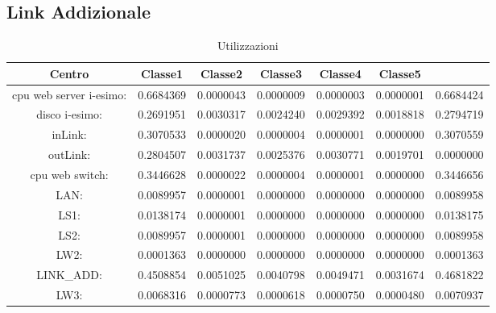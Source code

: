 \subsection{Link Addizionale}
\begin{table}[H]
\begin{center}\begin{scriptsize}
\begin{tabular}{||c|c|c|c|c|c||}
\hline
Centro &Classe1 &Classe2 &Classe3 &Classe4 &Classe5\\
\hline
\hline
 cpu web server i-esimo: 	&0.6684369	&0.0000043	&0.0000009	&0.0000003	&0.0000001	&0.6684424	\\\hline
 disco i-esimo: 	&0.2691951	&0.0030317	&0.0024240	&0.0029392	&0.0018818	&0.2794719	\\\hline
 inLink: 	&0.3070533	&0.0000020	&0.0000004	&0.0000001	&0.0000000	&0.3070559	\\\hline
 outLink: 	&0.2804507	&0.0031737	&0.0025376	&0.0030771	&0.0019701	&0.0000000	\\\hline
 cpu web switch: 	&0.3446628	&0.0000022	&0.0000004	&0.0000001	&0.0000000	&0.3446656	\\\hline
 LAN: 	&0.0089957	&0.0000001	&0.0000000	&0.0000000	&0.0000000	&0.0089958	\\\hline
 LS1: 	&0.0138174	&0.0000001	&0.0000000	&0.0000000	&0.0000000	&0.0138175	\\\hline
 LS2:	&0.0089957	&0.0000001	&0.0000000	&0.0000000	&0.0000000	&0.0089958	\\\hline
 LW2: 	&0.0001363	&0.0000000	&0.0000000	&0.0000000	&0.0000000	&0.0001363	\\\hline
 LINK_ADD: 	&0.4508854	&0.0051025	&0.0040798	&0.0049471	&0.0031674	&0.4681822	\\\hline
 LW3: 	&0.0068316	&0.0000773	&0.0000618	&0.0000750	&0.0000480	&0.0070937	\\\hline
\end{tabular}
\end{scriptsize}\end{center}
\caption{Utilizzazioni}
\label{utilizzazioni}
\end{table}

